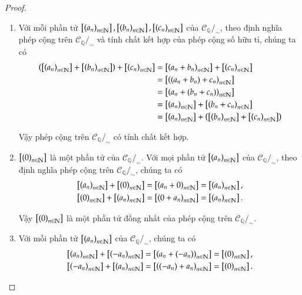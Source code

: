 \begin{proof}
    \begin{enumerate}[label={(\roman*)}]
        \item Với mỗi phần tử $\clsseq{a_{n}}{n}, \clsseq{b_{n}}{n}, \clsseq{c_{n}}{n}$ của $\mathscr{C}_{\mathbb{Q}}/_{\sim}$, theo định nghĩa phép cộng trên $\mathscr{C}_{\mathbb{Q}}/_{\sim}$ và tính chất kết hợp của phép cộng số hữu tỉ, chúng ta có
              \begin{align*}
                  \left(\clsseq{a_{n}}{n} + \clsseq{b_{n}}{n}\right) + \clsseq{c_{n}}{n} & = \clsseq{a_{n} + b_{n}}{n} + \clsseq{c_{n}}{n}                          \\
                                                                                         & = \clsseq{(a_{n} + b_{n}) + c_{n}}{n}                                    \\
                                                                                         & = \clsseq{a_{n} + (b_{n} + c_{n})}{n}                                    \\
                                                                                         & = \clsseq{a_{n}}{n} + \clsseq{b_{n} + c_{n}}{n}                          \\
                                                                                         & = \clsseq{a_{n}}{n} + \left(\clsseq{b_{n}}{n} + \clsseq{c_{n}}{n}\right)
              \end{align*}

              Vậy phép cộng trên $\mathscr{C}_{\mathbb{Q}}/_{\sim}$ có tính chất kết hợp.
        \item $\clsseq{0}{n}$ là một phần tử của $\mathscr{C}_{\mathbb{Q}}/_{\sim}$. Với mọi phần tử $\clsseq{a_{n}}{n}$ của $\mathscr{C}_{\mathbb{Q}}/_{\sim}$, theo định nghĩa phép cộng trên $\mathscr{C}_{\mathbb{Q}}/_{\sim}$, chúng ta có
              \begin{align*}
                  \clsseq{a_{n}}{n} + \clsseq{0}{n} & = \clsseq{a_{n} + 0}{n} = \clsseq{a_{n}}{n}, \\
                  \clsseq{0}{n} + \clsseq{a_{n}}{n} & = \clsseq{0 + a_{n}}{n} = \clsseq{a_{n}}{n}.
              \end{align*}

              Vậy $\clsseq{0}{n}$ là một phần tử đồng nhất của phép cộng trên $\mathscr{C}_{\mathbb{Q}}/_{\sim}$.
        \item Với mỗi phần tử $\clsseq{a_{n}}{n}$ của $\mathscr{C}_{\mathbb{Q}}/_{\sim}$, chúng ta có
              \begin{align*}
                  \clsseq{a_{n}}{n} + \clsseq{-a_{n}}{n} & = \clsseq{a_{n} + (-a_{n})}{n} = \clsseq{0}{n}, \\
                  \clsseq{-a_{n}}{n} + \clsseq{a_{n}}{n} & = \clsseq{(-a_{n}) + a_{n}}{n} = \clsseq{0}{n}.
              \end{align*}


\end{enumerate}
\end{proof}
